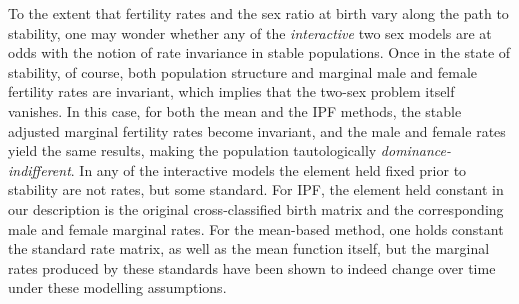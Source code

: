 To the extent that fertility rates and the sex ratio at
birth vary along the path to stability, one may wonder whether any of the
\textit{interactive} two sex models are at odds with the notion of
rate invariance in stable populations. Once in the state of stability, of
course, both population structure and marginal male and female fertility rates are invariant, which
implies that the two-sex problem itself vanishes. In this case, for both the
mean and the IPF methods, the stable adjusted marginal fertility rates become
invariant, and the male and female rates yield the same results, making the
population tautologically \textit{dominance-indifferent}. In any of the
interactive models the element held fixed prior to stability are not rates, but
some standard. For IPF, the element held constant in our 
description is the original cross-classified birth matrix and the corresponding 
male and female marginal rates. For the mean-based method, one holds constant 
the standard rate matrix, as well as the mean function itself, but the marginal 
rates produced by these standards have been shown to indeed change over time
under these modelling assumptions.




